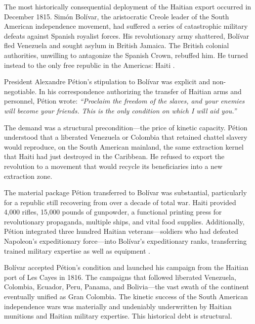 The most historically consequential deployment of the Haitian export occurred in December 1815. Simón Bolívar, the aristocratic Creole leader of the South American independence movement, had suffered a series of catastrophic military defeats against Spanish royalist forces. His revolutionary army shattered, Bolívar fled Venezuela and sought asylum in British Jamaica. The British colonial authorities, unwilling to antagonize the Spanish Crown, rebuffed him. He turned instead to the only free republic in the Americas: Haiti \cite{petion_bolivar_1816}.

\begin{historicalsource}
President Alexandre Pétion's stipulation to Bolívar was explicit and non-negotiable. In his correspondence authorizing the transfer of Haitian arms and personnel, Pétion wrote: \textit{``Proclaim the freedom of the slaves, and your enemies will become your friends. This is the only condition on which I will aid you.''} \cite{petion_bolivar_1816}

The demand was a structural precondition---the price of kinetic capacity. Pétion understood that a liberated Venezuela or Colombia that retained chattel slavery would reproduce, on the South American mainland, the same extraction kernel that Haiti had just destroyed in the Caribbean. He refused to export the revolution to a movement that would recycle its beneficiaries into a new extraction zone.
\end{historicalsource}

The material package Pétion transferred to Bolívar was substantial, particularly for a republic still recovering from over a decade of total war. Haiti provided 4,000 rifles, 15,000 pounds of gunpowder, a functional printing press for revolutionary propaganda, multiple ships, and vital food supplies. Additionally, Pétion integrated three hundred Haitian veterans---soldiers who had defeated Napoleon's expeditionary force---into Bolívar's expeditionary ranks, transferring trained military expertise as well as equipment \cite{petion_bolivar_1816}.

Bolívar accepted Pétion's condition and launched his campaign from the Haitian port of Les Cayes in 1816. The campaigns that followed liberated Venezuela, Colombia, Ecuador, Peru, Panama, and Bolivia---the vast swath of the continent eventually unified as Gran Colombia. The kinetic success of the South American independence wars was materially and undeniably underwritten by Haitian munitions and Haitian military expertise. This historical debt is structural.

